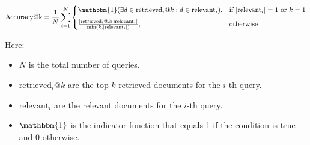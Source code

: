 \documentclass{scrartcl}
\begin{document}
\begin{equation}
\text{Accuracy@k} = \frac{1}{N} \sum_{i=1}^{N} 
    \begin{cases}
      \mathbbm{1}(\exists d \in \text{retrieved}_i@k : d \in \text{relevant}_i), & \text{if } |\text{relevant}_i| = 1 \text{ or } k = 1 \\[6pt]
      \frac{|\text{retrieved}_i@k \cap \text{relevant}_i|}{\min(k, |\text{relevant}_i|)}, & \text{otherwise}
    \end{cases}
\end{equation}

Here:
\begin{itemize}
    \item \(N\) is the total number of queries.
    \item \(\text{retrieved}_i@k\) are the top-\(k\) retrieved documents for the \(i\)-th query.
    \item \(\text{relevant}_i\) are the relevant documents for the \(i\)-th query.
    \item \(\mathbbm{1}\) is the indicator function that equals 1 if the condition is true and 0 otherwise.
\end{itemize}
\end{document}
